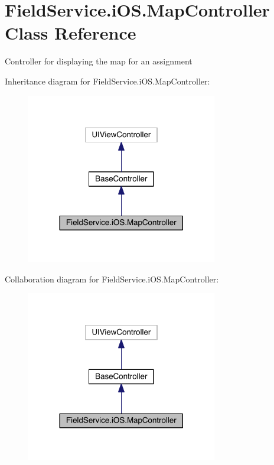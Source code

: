 \hypertarget{class_field_service_1_1i_o_s_1_1_map_controller}{\section{Field\+Service.\+i\+O\+S.\+Map\+Controller Class Reference}
\label{class_field_service_1_1i_o_s_1_1_map_controller}
}


Controller for displaying the map for an assignment  




Inheritance diagram for Field\+Service.\+i\+O\+S.\+Map\+Controller\+:
\nopagebreak
\begin{figure}[H]
\begin{center}
\leavevmode
\includegraphics[width=236pt]{class_field_service_1_1i_o_s_1_1_map_controller__inherit__graph}
\end{center}
\end{figure}


Collaboration diagram for Field\+Service.\+i\+O\+S.\+Map\+Controller\+:
\nopagebreak
\begin{figure}[H]
\begin{center}
\leavevmode
\includegraphics[width=236pt]{class_field_service_1_1i_o_s_1_1_map_controller__coll__graph}
\end{center}
\end{figure}
